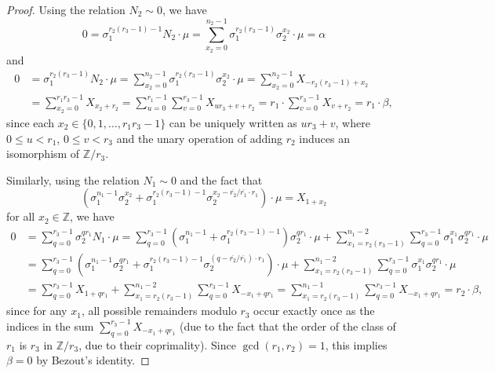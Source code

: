\documentclass[12pt,a4paper]{article}
\theoremstyle{definition}
\newcommand{\Z}{\mathbb{Z}}
\newcommand{\uo}{\overline{r_2}}
\newcommand{\vo}{\overline{r_1}}
\begin{document}
\begin{proof}
Using the relation $N_2\sim 0$, we have $$0=\sigma_1^{r_2(r_3-1)-1}N_2\cdot \mu =\sum_{x_2=0}^{n_2-1}  \sigma_1^{r_2(r_3-1)}\sigma_2^{x_2}\cdot \mu= \alpha$$ and
\begin{align*}
0&= \sigma_1^{r_2(r_3-1)}N_2\cdot \mu=\sum_{x_2=0}^{n_2-1}  \sigma_1^{r_2(r_3-1)}\sigma_2^{x_2}\cdot \mu=\sum_{x_2=0}^{n_2-1}  X_{-r_2(r_3-1)+x_2}\\
&=\sum_{x_2=0}^{r_1r_3-1}  X_{x_2+r_2}=
\sum_{u=0}^{r_1-1}\sum_{v=0}^{r_3-1} X_{ur_3+v+r_2}=r_1\cdot \sum_{v=0}^{r_3-1} X_{v+r_2}=r_1\cdot \beta,
\end{align*}
since each $x_2\in\{0,1,\dots,r_1r_3-1\}$ can be uniquely written as $ur_3+v$, where $0\leq u<r_1$, $0\leq v<r_3$ and the unary operation of adding $r_2$ induces an isomorphism of $\Z/r_3$.

Similarly, using the relation $N_1\sim 0$ and the fact that $$(\sigma_1^{n_1-1}\sigma_2^{x_2}+\sigma_1^{r_2(r_3-1)-1}\sigma_2^{x_2-\uo/\vo\cdot r_1})\cdot \mu=X_{1+x_2}$$ for all $x_2\in\Z$, we have 
\begin{align*}
0&= \sum_{q=0}^{r_3-1} \sigma_2^{qr_1}N_1\cdot \mu =\sum_{q=0}^{r_3-1}\left(\sigma_1^{n_1-1}+\sigma_1^{r_2(r_3-1)-1}\right) \sigma_2^{qr_1}\cdot \mu   
+\sum_{x_1=r_2(r_3-1)}^{n_1-2}\sum_{q=0}^{r_3-1} \sigma_1^{x_1}\sigma_2^{qr_1}\cdot \mu\\
&=\sum_{q=0}^{r_3-1}(\sigma_1^{n_1-1}\sigma_2^{qr_1}+\sigma_1^{r_2(r_3-1)-1}\sigma_2^{(q-\uo/\vo)\cdot r_1})\cdot \mu
+\sum_{x_1=r_2(r_3-1)}^{n_1-2}\sum_{q=0}^{r_3-1} \sigma_1^{x_1}\sigma_2^{qr_1}\cdot \mu\\
&=\sum_{q=0}^{r_3-1}X_{1+qr_1}+\sum_{x_1=r_2(r_3-1)}^{n_1-2}\sum_{q=0}^{r_3-1}X_{-x_1+qr_1}
= \sum_{x_1=r_2(r_3-1)}^{n_1-1}\sum_{q=0}^{r_3-1}X_{-x_1+qr_1}
=r_2\cdot \beta,
\end{align*}
since for any $x_1$, all possible remainders modulo $r_3$ occur exactly once as the indices in the sum $\sum_{q=0}^{r_3-1}X_{-x_1+qr_1}$ (due to the fact that the order of the class of $r_1$ is $r_3$ in $\Z/r_3$, due to their coprimality).
Since $\gcd(r_1,r_2)=1$, this implies $\beta=0$ by Bezout's identity.
\end{proof}
\end{document}
